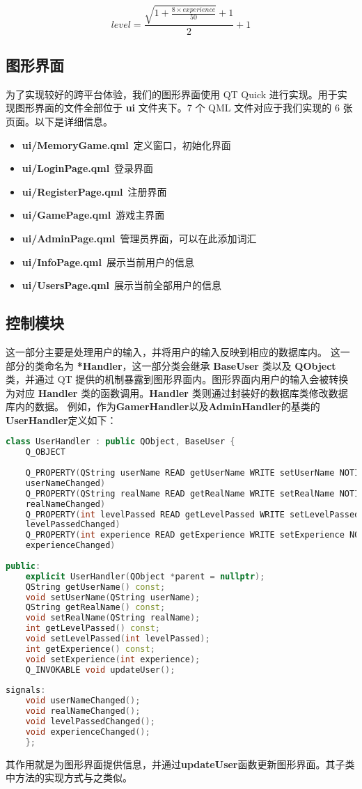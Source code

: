 \documentclass[blue,normal,cn]{elegantnote}
\begin{document}
$$level = \frac{\sqrt{1 + \frac{8 \times experience}{50}} + 1}{2} + 1$$

\subsection{图形界面}
为了实现较好的跨平台体验，我们的图形界面使用 QT Quick 进行实现。用于实现图形界面的文件全部位于 \textbf{ui} 文件夹下。7 个 QML 文件对应于我们实现的 6 张页面。以下是详细信息。

\begin{itemize}
	\item \textbf{ui/MemoryGame.qml}\ 定义窗口，初始化界面
	\item \textbf{ui/LoginPage.qml}\ 登录界面
	\item \textbf{ui/RegisterPage.qml}\ 注册界面
	\item \textbf{ui/GamePage.qml}\ 游戏主界面
	\item \textbf{ui/AdminPage.qml}\ 管理员界面，可以在此添加词汇
	\item \textbf{ui/InfoPage.qml}\ 展示当前用户的信息
	\item \textbf{ui/UsersPage.qml}\ 展示当前全部用户的信息
\end{itemize}

\subsection{控制模块}
这一部分主要是处理用户的输入，并将用户的输入反映到相应的数据库内。
这一部分的类命名为 \textbf{*Handler}，这一部分类会继承 \textbf{BaseUser} 类以及 \textbf{QObject} 类，并通过 QT 提供的机制暴露到图形界面内。图形界面内用户的输入会被转换为对应 \textbf{Handler} 类的函数调用。\textbf{Handler} 类则通过封装好的数据库类修改数据库内的数据。
例如，作为\textbf{GamerHandler}以及\textbf{AdminHandler}的基类的\textbf{UserHandler}定义如下：
\begin{lstlisting}[language=C++]
class UserHandler : public QObject, BaseUser {
	Q_OBJECT
	
	Q_PROPERTY(QString userName READ getUserName WRITE setUserName NOTIFY
	userNameChanged)
	Q_PROPERTY(QString realName READ getRealName WRITE setRealName NOTIFY
	realNameChanged)
	Q_PROPERTY(int levelPassed READ getLevelPassed WRITE setLevelPassed NOTIFY
	levelPassedChanged)
	Q_PROPERTY(int experience READ getExperience WRITE setExperience NOTIFY
	experienceChanged)
	
public:
	explicit UserHandler(QObject *parent = nullptr);
	QString getUserName() const;
	void setUserName(QString userName);
	QString getRealName() const;
	void setRealName(QString realName);
	int getLevelPassed() const;
	void setLevelPassed(int levelPassed);
	int getExperience() const;
	void setExperience(int experience);
	Q_INVOKABLE void updateUser();
	
signals:
	void userNameChanged();
	void realNameChanged();
	void levelPassedChanged();
	void experienceChanged();
	};
\end{lstlisting}
其作用就是为图形界面提供信息，并通过\textbf{updateUser}函数更新图形界面。其子类中方法的实现方式与之类似。
\end{document}
